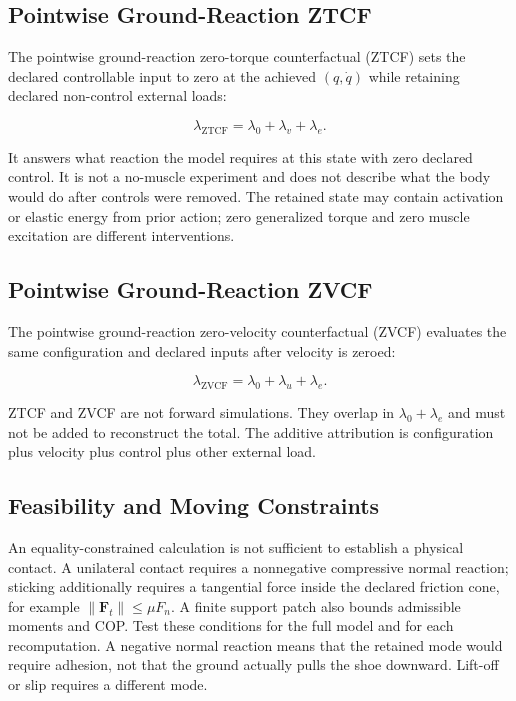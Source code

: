 \subsection{Pointwise Ground-Reaction ZTCF}\label{grf-pointwise-ground-reaction-ztcf}

The pointwise ground-reaction zero-torque counterfactual (ZTCF) sets the declared controllable input to zero at the achieved \((q,\dot q)\) while retaining declared non-control external loads:

\[
\lambda_{\mathrm{ZTCF}}=\lambda_0+\lambda_v+\lambda_e.
\]

It answers what reaction the model requires at this state with zero declared control. It is not a no-muscle experiment and does not describe what the body would do after controls were removed. The retained state may contain activation or elastic energy from prior action; zero generalized torque and zero muscle excitation are different interventions.

\subsection{Pointwise Ground-Reaction ZVCF}\label{grf-pointwise-ground-reaction-zvcf}

The pointwise ground-reaction zero-velocity counterfactual (ZVCF) evaluates the same configuration and declared inputs after velocity is zeroed:

\[
\lambda_{\mathrm{ZVCF}}=\lambda_0+\lambda_u+\lambda_e.
\]

ZTCF and ZVCF are not forward simulations. They overlap in \(\lambda_0+\lambda_e\) and must not be added to reconstruct the total. The additive attribution is configuration plus velocity plus control plus other external load.

\subsection{Feasibility and Moving Constraints}\label{grf-feasibility-and-moving-constraints}

An equality-constrained calculation is not sufficient to establish a physical contact. A unilateral contact requires a nonnegative compressive normal reaction; sticking additionally requires a tangential force inside the declared friction cone, for example \(\|\bm F_t\|\leq\mu F_n\). A finite support patch also bounds admissible moments and COP. Test these conditions for the full model and for each recomputation. A negative normal reaction means that the retained mode would require adhesion, not that the ground actually pulls the shoe downward. Lift-off or slip requires a different mode.

